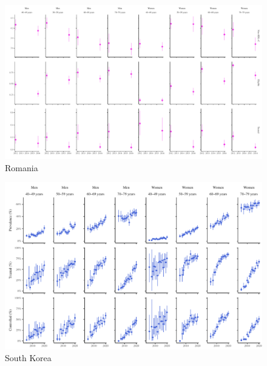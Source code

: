 \documentclass[12pt]{article}
\begin{document}
\begin{appendix}
\begin{landscape}
        \begin{figure}[H]
            \centering
            \includegraphics[width=\linewidth]{../3_figures/countries/fig_romania.pdf}
            \caption{Romania}
            \label{fig:romania}
        \end{figure}

        \begin{figure}[H]
            \centering
            \includegraphics[width=\linewidth]{../3_figures/countries/fig_south korea.pdf}
            \caption{South Korea}
            \label{fig:korea}
        \end{figure}


\end{landscape}
\end{appendix}
\end{document}
